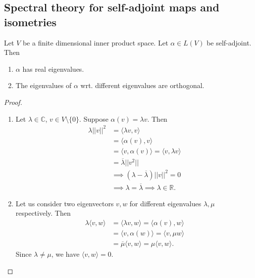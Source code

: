 \documentclass[a4paper]{scrartcl}
\begin{document}
\subsection{Spectral theory for self-adjoint maps and isometries}
\begin{lemma}
      Let $V$ be a finite dimensional inner product space. Let $\alpha \in L (V)$ be self-adjoint. Then
      \begin{enumerate}
           \item $\alpha $ has real eigenvalues.
           \item The eigenvalues of $\alpha$ wrt. different eigenvalues are orthogonal.
      \end{enumerate}
\end{lemma}
\begin{proof}
      \begin{enumerate}
           \item Let $\lambda \in \mathbb{C}$, $v \in V\setminus \{0\}$. Suppose $\alpha (v)= \lambda v$. Then 
           \begin{align*}
                \lambda ||v||^2&=\langle \lambda v,v \rangle\\
                &=\langle \alpha (v), v \rangle \\
                &=\langle v, \alpha (v) \rangle =\langle v,\lambda v \rangle \\&= \overline{\lambda} ||v^2||\\
                &\implies (\lambda-\overline{\lambda} )||v||^2=0\\
                &\implies \lambda=\overline{\lambda}  \implies \lambda \in \mathbb{R}.
           \end{align*}
           \item Let us consider two eigenvectors $v,w$ for different eigenvalues $\lambda, \mu $ respectively. Then
           \begin{align*}
                \lambda \langle v,w \rangle &=\langle \lambda v,w \rangle
                =\langle \alpha (v), w \rangle \\
                &=\langle v, \alpha (w) \rangle = \langle v, \mu w \rangle \\
                &=\overline{\mu} \langle v,w \rangle =\mu \langle v,w \rangle.
           \end{align*}
           Since $\lambda \neq \mu$, we have $\langle v,w \rangle =0$.
      \end{enumerate}
\end{proof}
\end{document}
